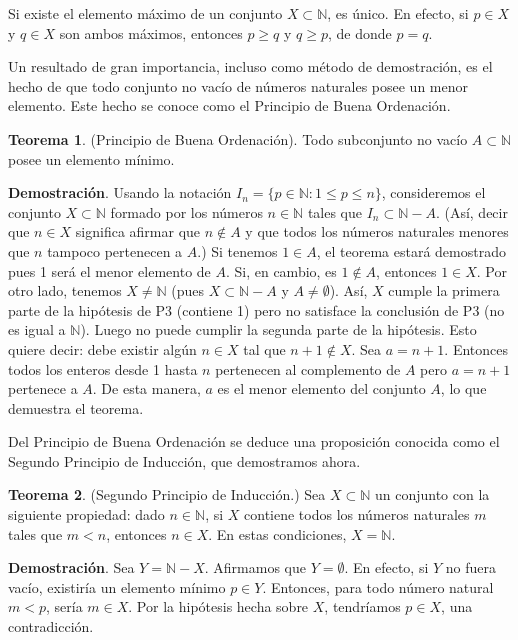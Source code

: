 \documentclass[12pt,oneside]{book}
\begin{document}
Si existe el elemento máximo de un conjunto \( X \subset \mathbb{N} \), es único. En efecto, si \( p \in X \) y \( q \in X \) son ambos máximos, entonces \( p \geq q \) y \( q \geq p \), de donde \( p = q \).

Un resultado de gran importancia, incluso como método de demostración, es el hecho de que todo conjunto no vacío de números naturales posee un menor elemento. Este hecho se conoce como el Principio de Buena Ordenación.

\textbf{Teorema 1}. (Principio de Buena Ordenación). Todo subconjunto no vacío \( A \subset \mathbb{N} \) posee un elemento mínimo.

\textbf{Demostración}. Usando la notación \( I_n = \{p \in \mathbb{N} : 1 \leq p \leq n\} \), consideremos el conjunto \( X \subset \mathbb{N} \) formado por los números \( n \in \mathbb{N} \) tales que \( I_n \subset \mathbb{N} - A \). (Así, decir que \( n \in X \) significa afirmar que \( n \notin A \) y que todos los números naturales menores que \( n \) tampoco pertenecen a \( A \).) Si tenemos \( 1 \in A \), el teorema estará demostrado pues 1 será el menor elemento de \( A \). Si, en cambio, es \( 1 \notin A \), entonces \( 1 \in X \). Por otro lado, tenemos \( X \neq \mathbb{N} \) (pues \( X \subset \mathbb{N} - A \) y \( A \neq \emptyset \)). Así, \( X \) cumple la primera parte de la hipótesis de P3 (contiene 1) pero no satisface la conclusión de P3 (no es igual a \(\mathbb{N}\)). Luego no puede cumplir la segunda parte de la hipótesis. Esto quiere decir: debe existir algún \( n \in X \) tal que \( n + 1 \notin X \). Sea \( a = n + 1 \). Entonces todos los enteros desde 1 hasta \( n \) pertenecen al complemento de \( A \) pero \( a = n + 1 \) pertenece a \( A \). De esta manera, \( a \) es el menor elemento del conjunto \( A \), lo que demuestra el teorema.

Del Principio de Buena Ordenación se deduce una proposición conocida como el Segundo Principio de Inducción, que demostramos ahora.

\textbf{Teorema 2}. (Segundo Principio de Inducción.) Sea \( X \subset \mathbb{N} \) un conjunto con la siguiente propiedad: dado \( n \in \mathbb{N} \), si \( X \) contiene todos los números naturales \( m \) tales que \( m < n \), entonces \( n \in X \). En estas condiciones, \( X = \mathbb{N} \).

\textbf{Demostración}. Sea \( Y = \mathbb{N} - X \). Afirmamos que \( Y = \emptyset \). En efecto, si \( Y \) no fuera vacío, existiría un elemento mínimo \( p \in Y \). Entonces, para todo número natural \( m < p \), sería \( m \in X \). Por la hipótesis hecha sobre \( X \), tendríamos \( p \in X \), una contradicción.
\end{document}
